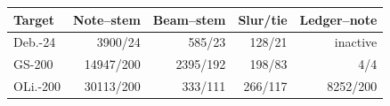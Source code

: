 \begin{center}
\begin{minipage}{\columnwidth}
\label{tab:edge-inventory}
\centering
\footnotesize
\setlength{\tabcolsep}{1.5pt}
\begin{tabular}{@{}lrrrr@{}}
\toprule
Target & Note--stem & Beam--stem & Slur/tie & Ledger--note \\
\midrule
Deb.-24 & 3900/24 & 585/23 & 128/21 & inactive \\
GS-200 & 14947/200 & 2395/192 & 198/83 & 4/4 \\
OLi.-200 & 30113/200 & 333/111 & 266/117 & 8252/200 \\
\bottomrule
\end{tabular}
\end{minipage}
\end{center}
